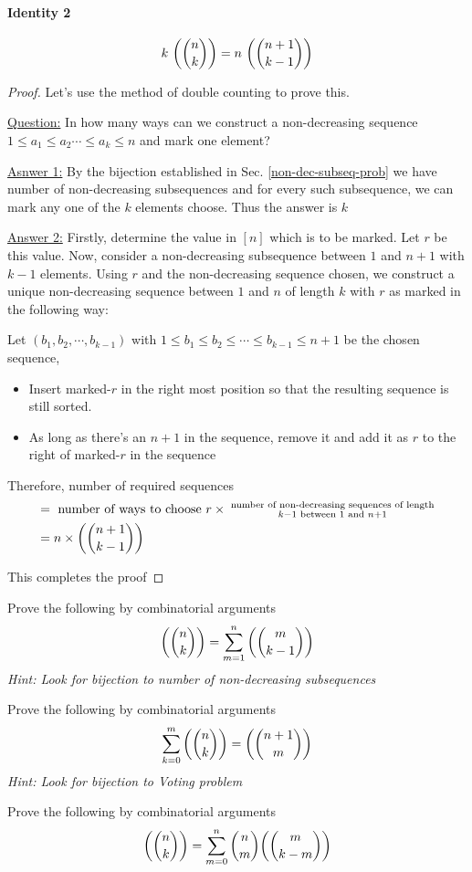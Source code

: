\paragraph{Identity 2}
$$k~\textrm{$\left(\binom{n}{k}\right)$}=n~\textrm{$\left(\binom{n+1}{k-1}\right)$}$$
\begin{proof}
Let's use the method of double counting to prove this.
\begin{description}
\item \underline{Question:} In how many ways can we construct a non-decreasing sequence $1\leq a_1\leq a_2\cdots\leq a_k\leq n$ and mark one element?
\item \underline{Asnwer 1:} By the bijection established in Sec. \ref{non-dec-subseq-prob} we have  number of non-decreasing subsequences and for every such subsequence, we can mark any one of the $k$ elements choose. Thus the answer is $k$  
\item \underline{Answer 2:} Firstly, determine the value in $[n]$ which is to be marked. Let $r$ be this value. Now, consider a non-decreasing subsequence between $1$ and $n+1$ with $k-1$ elements. Using $r$ and the non-decreasing sequence chosen, we construct a unique non-decreasing sequence between $1$ and $n$ of length $k$ with $r$ as marked in the following way:

Let $(b_1,b_2,\cdots,b_{k-1})$ with $1\leq b_1\leq b_2\leq\cdots\leq b_{k-1}\leq n+1$ be the chosen sequence, 
\begin{itemize}
    \item Insert marked-$r$ in the right most position so that the resulting sequence is still sorted.
    \item As long as there's an $n+1$ in the sequence, remove it and add it as $r$ to the right of marked-$r$ in the sequence
\end{itemize}
Therefore, number of required sequences 
\begin{align*}
    &= \textrm{ number of ways to choose }r \times \substack{\textrm{ number of non-decreasing sequences of length }\\ k-1 \textrm{ between } 1 \textrm{ and } n+1}\\
    &= n\times \textrm{$\left(\binom{n+1}{k-1}\right)$}
\end{align*}
\end{description}
This completes the proof
\end{proof}

\begin{ex}
    \item Prove the following by combinatorial arguments $$\textrm{$\left(\binom{n}{k}\right)$}=\sum\limits_{m=1}^{n}\textrm{$\left(\binom{m}{k-1}\right)$}$$ \emph{Hint: Look for bijection to number of non-decreasing subsequences}
    \item Prove the following by combinatorial arguments $$\sum\limits_{k=0}^{m}\textrm{$\left(\binom{n}{k}\right)$}=\textrm{$\left(\binom{n+1}{m}\right)$}$$ \emph{Hint: Look for bijection to Voting problem}
    \item Prove the following by combinatorial arguments $$\textrm{$\left(\binom{n}{k}\right)$}=\sum\limits_{m=0}^{n}\binom{n}{m}\textrm{$\left(\binom{m}{k-m}\right)$}$$
\end{ex}

